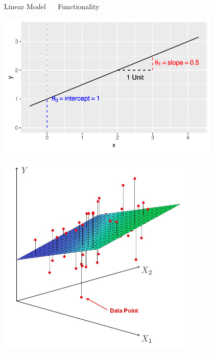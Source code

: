 \documentclass[11pt,compress,t,notes=noshow, xcolor=table]{beamer}
\begin{document}
\begin{frame}{\textcolor{gray!80}{Linear Model} ~~ Functionality}
\medskip
\footnotesize
\begin{minipage}{0.45\textwidth}
  \includegraphics[width=0.8\textwidth]{figure/reg_lm_plot.pdf}
\end{minipage}
 \normalsize 
\begin{minipage}{0.45\textwidth}
  \includegraphics[width=0.7\textwidth]{figure/regression_hyperplane.jpg}
\end{minipage}

\end{frame}

\end{document}
